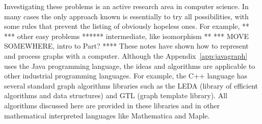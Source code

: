Investigating these problems is an active
research area in
computer science. In many cases the only approach known is essentially
to try all possibilities, with some rules that prevent the listing of
obviously hopeless ones. For example, ** *** other easy problems
****** intermediate, like isomorphism **
*** MOVE SOMEWHERE, intro to Part? ****
These notes have shown how to represent and process graphs with a
computer. Although the Appendix~\ref{app:javagraph} uses the Java
programming language, the ideas and algorithms are applicable to other
industrial programming languages.  For example, the C++ language has
several standard graph algorithms libraries such as the LEDA (library of
efficient algorithms and data structures) and GTL (graph template
library). All algorithms discussed here are provided in these libraries
and in other mathematical interpreted languages like Mathematica and
Maple.


